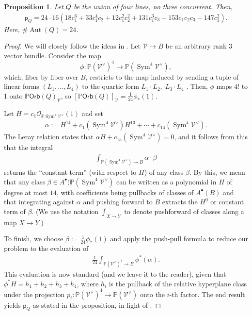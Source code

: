 \documentclass[12 pt, reqno]{amsart}
\newtheorem{prop}[thm]{Proposition}
\theoremstyle{definition}
\newcommand{\on}{\operatorname}
\newcommand{\mb}{\mathbb}
\newcommand{\mc}{\mathcal}
\newcommand{\ms}{\mathscr}
\renewcommand{\P}{\mb{P}}
\newcommand{\Orb}{\mathsf{Orb}}
\newcommand{\p}{\mathsf{p}}
\begin{document}
\begin{prop}
\label{fourlines}
Let $Q$ be the union of four lines, no three concurrent. Then,
\begin{align*}
  \p_Q = 24\cdot 16 (18 c_1^6 + 33 c_1^4 c_2 + 12 c_1^2 c_2^2 + 131 c_1^3 c_3 + 
  153 c_1 c_2 c_3 - 147 c_3^2).
\end{align*}
Here, $\#\on{Aut}(Q)=24$.
\end{prop}

\begin{proof}
  We will closely follow the ideas in \cite[Theorem 3.1]{FNR06}. Let
  $\mathcal{V} \to B$ be an arbitrary rank $3$ vector bundle. Consider
  the map
  $$\phi: \mb{P}(\mc{V}^{\vee})^4\to \mb{P}(\on{Sym}^4\mc{V}^{\vee}),$$
  which, fiber by fiber over $B$, restricts to the map induced by
  sending a tuple of linear forms $(L_1, \dots, L_{4})$ to the quartic
  form $L_1 \cdot L_2, \cdot L_{3} \cdot L_{4}$ . Then, $\phi$ maps
  $4!$ to 1 onto $\mb{P}\Orb(Q)_{\mathcal{V}}$, so
  $[\mb{P}\Orb(Q)]_{\mathcal{V}}=\frac{1}{24}\phi_{*}(1)$.

  Let $H=c_{1}\ms{O}_{\mb{P}\on{Sym}^4\mc{V}^{\vee}}(1)$ and set
\begin{align*}
  \alpha := H^{14}+c_1(\on{Sym}^4\mc{V}^{\vee})H^{13}+\cdots+c_{14}(\on{Sym}^4\mc{V}^{\vee}). 
\end{align*}
The Leray relation states that
$\alpha H + c_{15}(\on{Sym}^4\mc{V}^{\vee})=0$, and it follows from
this that the integral
\begin{align*}
  \int_{\mb{P}(\on{Sym}^4\mc{V}^{\vee})\to B}\alpha \cdot \beta
\end{align*}
returns the ``constant term'' (with respect to $H$) of any class
$\beta$. By this, we mean that any class
$\beta\in A^{\bullet}(\mb{P}(\on{Sym}^4\mc{V}^{\vee})$ can be written
as a polynomial in $H$ of degree at most $14$, with coefficients being
pullbacks of classes of $A^{\bullet}(B)$ and that integrating against
$\alpha$ and pushing forward to $B$ extracts the $H^{0}$ or constant
term of $\beta$.  (We use the notation $\int_{X \to Y}$ to denote
pushforward of classes along a map $X \to Y$.)

To finish, we choose $\beta :=\frac{1}{24}\phi_{*}(1)$ and apply the
push-pull formula to reduce our problem to the evaluation of
\begin{align*}
    \frac{1}{24}\int_{\mb{P}(\mc{V}^{\vee})^4\to B}\phi^{*}(\alpha).
\end{align*}
This evaluation is now standard (and we leave it to the reader), given
that $\phi^{*}H = h_1 + h_2 + h_3 + h_4$, where $h_{i}$ is the
pullback of the relative hyperplane class under the projection
$p_{i}: \P(\mc{V}^{\vee})^{4} \to \P(\mc{V}^{\vee})$ onto the $i$-th
factor.  The end result yields $\p_Q$ as stated in the proposition, in
light of .
\end{proof}
\end{document}
